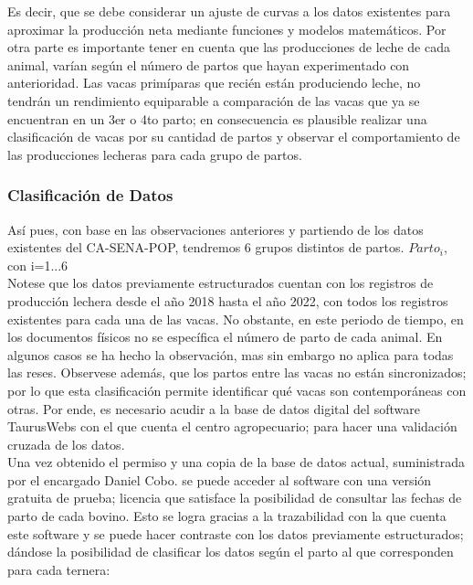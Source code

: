 Es decir, que se debe considerar un ajuste de curvas a los datos existentes para aproximar la producción neta mediante funciones y modelos matemáticos. Por otra parte es importante tener en cuenta que las producciones de leche de cada animal, varían según el número de partos que hayan experimentado con anterioridad. Las vacas primíparas que recién están produciendo leche, no tendrán un rendimiento equiparable a comparación de las vacas que ya se encuentran en un 3er o 4to parto; en consecuencia es plausible realizar una clasificación de vacas por su cantidad de partos y observar el comportamiento de las producciones lecheras para cada grupo de partos.\\

\subsubsection{Clasificación de Datos}\label{clasdatos}

Así pues, con base en las observaciones anteriores y partiendo de los datos existentes del CA-SENA-POP, tendremos 6 grupos distintos de partos. $Parto_{i}$, con i=1...6\\

Notese que los datos previamente estructurados cuentan con los registros de producción lechera desde el año 2018 hasta el año 2022, con todos los registros existentes para cada una de las vacas. No obstante, en este periodo de tiempo, en los documentos físicos no se específica el número de parto de cada animal. En algunos casos se ha hecho la observación, mas sin embargo no aplica para todas las reses. Observese además, que los partos entre las vacas no están sincronizados; por lo que esta clasificación permite identificar qué vacas son contemporáneas con otras. Por ende, es necesario acudir a la base de datos digital del software TaurusWebs con el que cuenta el centro agropecuario; para hacer una validación cruzada de los datos.\\

Una vez obtenido el permiso y una copia de la base de datos actual, suministrada por el encargado Daniel Cobo. se puede acceder al software con una versión gratuita de prueba; licencia que satisface la posibilidad de consultar las fechas de parto de cada bovino. Esto se logra gracias a la trazabilidad con la que cuenta este software y se puede hacer contraste con los datos previamente estructurados; dándose la posibilidad de clasificar los datos según el parto al que corresponden para cada ternera:

